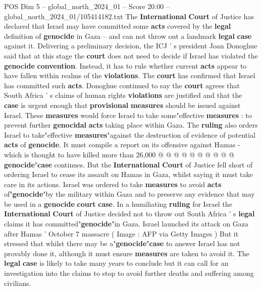 \begin{textsample}{POS Dim 5 – global\_north\_2024\_01 – Score 20.00 – global\_north\_2024\_01/105414182.txt}  \label{ex:f5_pos_115}
The \textbf{International} \textbf{Court} of Justice has declared that Israel may have committed some \textbf{acts} covered by the \textbf{legal} definition of \textbf{genocide} in Gaza -- and can not throw out a landmark \textbf{legal} \textbf{case} against it.
Delivering a preliminary decision, the ICJ ' s president Joan Donoghue said that at this stage the \textbf{court} does not need to decide if Israel has violated the \textbf{genocide} \textbf{convention}.
Instead, it has to rule whether current \textbf{acts} appear to have fallen within realms of the \textbf{violations}.
The \textbf{court} has confirmed that Israel has committed such \textbf{acts}.
Donoghue continued to say the \textbf{court} agrees that South Africa ' s claims of human rights \textbf{violations} are justified and that the \textbf{case} is urgent enough that \textbf{provisional} \textbf{measures} should be issued against Israel.
These \textbf{measures} would force Israel to take some"effective \textbf{measures} : to prevent further \textbf{genocidal} \textbf{acts} taking place within Gaza.
The \textbf{ruling} also orders Israel to take"effective \textbf{measures}"against the destruction of evidence of potential \textbf{acts} of \textbf{genocide}.
It must compile a report on its offensive against Hamas - which is thought to have killed more than 26,000 @ @ @ @ @ @ @ @ @ @ \textbf{genocide}"\textbf{case} continues.
But the \textbf{International} \textbf{Court} of Justice fell short of ordering Israel to cease its assault on Hamas in Gaza, whilst saying it must take care in its actions.
Israel was ordered to take \textbf{measures} to avoid \textbf{acts} of"\textbf{genocide}"by the military within Gaza and to preserve any evidence that may be used in a \textbf{genocide} \textbf{court} \textbf{case}.
In a humiliating \textbf{ruling} for Israel the \textbf{International} \textbf{Court} of Justice decided not to throw out South Africa ' s \textbf{legal} claims it has committed"\textbf{genocide}"in Gaza.
Israel launched its attack on Gaza after Hamas ' October 7 massacre ( Image : AFP via Getty Images ) But it stressed that whilst there may be a"\textbf{genocide}"\textbf{case} to answer Israel has not provably done it, although it must ensure \textbf{measures} are taken to avoid it.
The \textbf{legal} \textbf{case} is likely to take many years to conclude but it can call for an investigation into the claims to stop to avoid further deaths and suffering among civilians.

\end{textsample}
